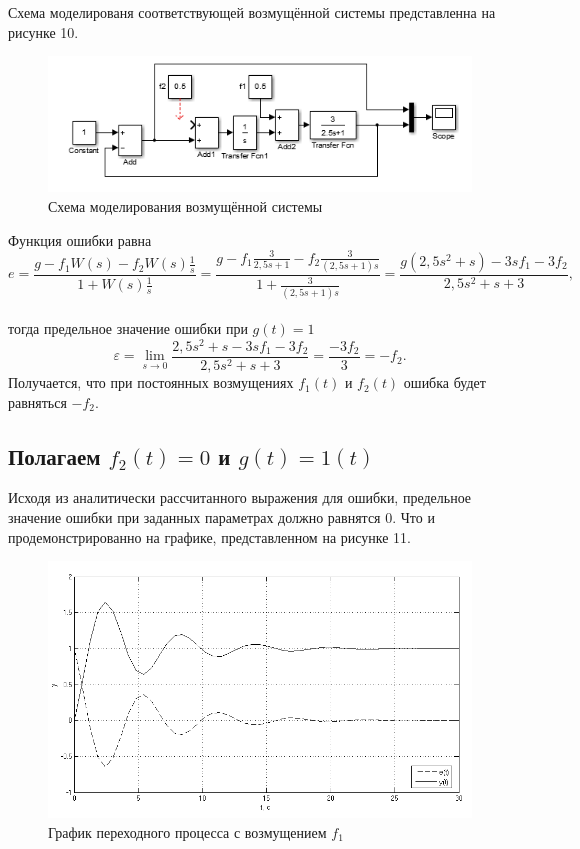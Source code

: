 \documentclass[a4paper, 11pt, russian]{article}
\begin{document}
    Схема моделированя соответствующей возмущённой системы представленна на рисунке 10.
    
    \begin{figure}[h!]
        \centering
        \includegraphics{dstScheme.PNG}
        \caption{Схема моделирования возмущённой системы}
    \end{figure}
    
    Функция ошибки равна $$e = \frac{g - f_1W(s) - f_2W(s)\displaystyle{\frac{1}{s}}}{1 + W(s)\displaystyle{\frac{1}{s}}} = \frac{g - f_1\displaystyle{\frac{3}{2,5s + 1}} - f_2\displaystyle{\frac{3}{(2,5s + 1)s}}}{1 + \displaystyle{\frac{3}{(2,5s + 1)s}}} = \frac{g(2,5s^2 + s) - 3sf_1 - 3f_2}{2,5s^2 + s + 3},$$\\
    тогда предельное значение ошибки при $g(t) = 1$ $$\varepsilon = \lim_{s\to0} \frac{2,5s^2 + s - 3sf_1 - 3f_2}{2,5s^2 + s + 3} = \frac{-3f_2}{3} = -f_2.$$
    Получается, что при постоянных возмущениях $f_1(t)$ и $f_2(t)$ ошибка будет равняться $-f_2$.
    \subsection{Полагаем $f_2(t) = 0$ и $g(t) = 1(t)$}
    Исходя из аналитически рассчитанного выражения для ошибки, предельное значение ошибки при заданных параметрах должно равнятся 0. Что и продемонстрированно на графике, представленном на рисунке 11.
    
    \begin{figure}[ht!]
        \centering
        \includegraphics[scale = 0.75]{disturbance1.png}
        \caption{График переходного процесса с возмущением $f_1$}
    \end{figure}
    \vspace{4.5cm}
\end{document}
